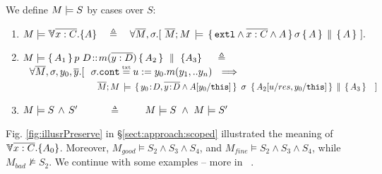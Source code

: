 \begin{definition}  
We define $M \models {S}$ by cases over $S$:  

\label{def:necessity-semantics}

\begin{enumerate}
 \item
\label{def:necessity-semantics-first}
 $\satisfies{M}{\TwoStatesN {\overline {x:C}} {A}} \ \  \ \triangleq   \ \ \ {\forall   \Mtwo,  \sigma.[\ {\satAssertQuadruple  \Mtwo  M    {\extThis \wedge \overline {x:C} \wedge A} \sigma {A} {A} }\ ].}$
  \item
   \label{def:necessity-semantics-second}
 $M \models   \{\, A_1\, \}\, p\ D\!::\!m(\overline{y:D})\, \{\, A_2\, \} \, \,\parallel\,\, \{ A_3 \}\  \ \ \   \triangleq  $ \\ %
$\strut \ \   \forall   \Mtwo,  \sigma, y_0,\overline y.[\ 
 \ \sigma.\prg{cont}\txteq {u:=y_0.m(y_1,..y_n)} \ \ \Longrightarrow \ \ $\\
$\strut  \ \ \   \ \ \ \ \ \ \ \ \   \ \ \  \ \ 
\ \ \ \ \ \ \ \ \ {\satAssertQuadruple  { \Mtwo} {M} { y_0\!:\!D, \overline {y\!:\!D}   \wedge   A[y_0/\prg{this}]}  {\ \sigma\ }   {A_2[u/res,y_0/\prg{this}] }{A_3 } } \  \ \  ]  $   
 \item
 $M \models S\, \wedge\, S'$\ \ \  \ \ \  $\triangleq$  \  \ \  \   $M \models S\ \wedge \ M \models S'$
\end{enumerate}
\end{definition}

Fig. \ref{fig:illusrPreserve} in  \S \ref{sect:approach:scoped}  illustrated  the meaning of ${\TwoStatesN {\overline {x:C}} {A_0}}$. 
Moreover, $M_{good} \models S_2 \wedge S_3 \wedge S_4$, and  $M_{fine} \models S_2 \wedge S_3 \wedge S_4$,
 while $M_{bad} \not\models S_2$.
We continue with some examples -- more in %
\A ~\aref{E.1.1}{\ref{app:spec}}.

